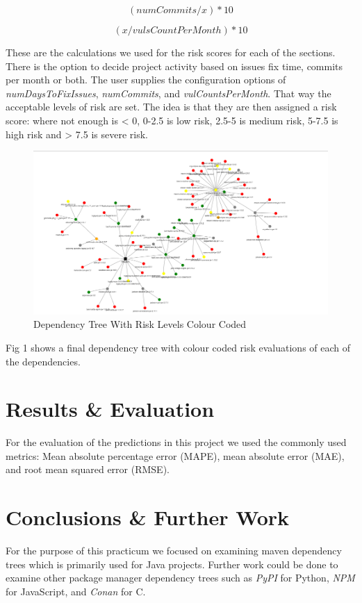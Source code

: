 \documentclass[10pt, onecolumn]{IEEEtran}
\begin{document}
\[( numCommits / x ) * 10\]

\[( x / vulsCountPerMonth ) * 10\]

These are the calculations we used for the risk scores for each of the sections. There is the option to decide project activity based on issues fix time, commits per month or both. The user supplies the configuration options of \textit{numDaysToFixIssues}, \textit{numCommits}, and \textit{vulCountsPerMonth}. That way the acceptable levels of risk are set. The idea is that they are then assigned a risk score: where not enough is < 0, 0-2.5 is low risk, 2.5-5 is medium risk, 5-7.5 is high risk and > 7.5 is severe risk. 

\begin{figure}
    \centering
    \includegraphics[width=01\linewidth]{image.png}
    \caption{Dependency Tree With Risk Levels Colour Coded} 
\end{figure}

Fig 1 shows a final dependency tree with colour coded risk evaluations of each of the dependencies.


\section{Results \& Evaluation}
For the evaluation of the predictions in this project we used the commonly used metrics: Mean absolute percentage error (MAPE), mean absolute error (MAE), and root mean squared error (RMSE). 

\section{Conclusions \& Further Work}
For the purpose of this practicum we focused on examining maven dependency trees which is primarily used for Java projects. Further work could be done to examine other package manager dependency trees such as \textit{PyPI} for Python, \textit{NPM} for JavaScript, and \textit{Conan} for C. 
\end{document}
